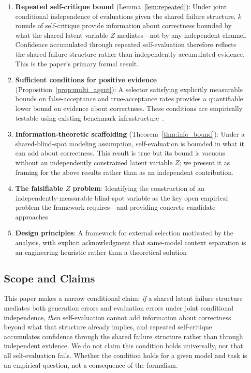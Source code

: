\documentclass[11pt]{article}
\begin{document}
\begin{enumerate}
    \item \textbf{Repeated self-critique bound} (Lemma~\ref{lem:repeated}): Under joint
    conditional independence of evaluations given the shared failure structure, $k$ rounds
    of self-critique provide information about correctness bounded by what the shared latent
    variable $Z$ mediates---not by any independent channel. Confidence accumulated through
    repeated self-evaluation therefore reflects the shared failure structure rather than
    independently accumulated evidence. This is the paper's primary formal result.
    \item \textbf{Sufficient conditions for positive evidence}
    (Proposition~\ref{prop:multi_agent}): A selector satisfying explicitly measurable
    bounds on false-acceptance and true-acceptance rates provides a quantifiable lower
    bound on evidence about correctness. These conditions are empirically testable using
    existing benchmark infrastructure~\citep{lin2024criticbench, kadavath2022ptrue}.
    \item \textbf{Information-theoretic scaffolding} (Theorem~\ref{thm:info_bound}): Under
    a shared-blind-spot modeling assumption, self-evaluation is bounded in what it can add
    about correctness. This result is true but its bound is vacuous without an independently
    constrained latent variable $Z$; we present it as framing for the above results rather
    than as an independent contribution.
    \item \textbf{The falsifiable $Z$ problem}: Identifying the construction of an
    independently-measurable blind-spot variable as the key open empirical problem the
    framework requires---and providing concrete candidate approaches
    \item \textbf{Design principles}: A framework for external selection motivated by the
    analysis, with explicit acknowledgment that same-model context separation is an
    engineering heuristic rather than a theoretical solution
\end{enumerate}

\subsection{Scope and Claims}

This paper makes a narrow conditional claim: \emph{if} a shared latent failure structure
mediates both generation errors and evaluation errors under joint conditional independence,
\emph{then} self-evaluation cannot add information about correctness beyond what that
structure already implies, and repeated self-critique accumulates confidence through the
shared failure structure rather than through independent evidence. We do not claim this
condition holds universally, nor that all self-evaluation fails. Whether the condition
holds for a given model and task is an empirical question, not a consequence of the
formalism.
\end{document}
